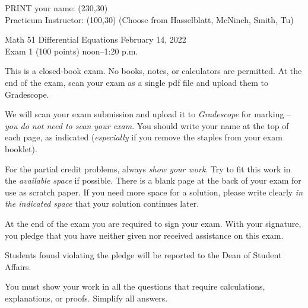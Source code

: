 \documentclass{article}
\begin{document}
\noindent
PRINT your name:  \framebox(230,30){}\\

\smallskip
\noindent
Practicum Instructor: \framebox(100,30){} (Choose from Hasselblatt, McNinch, Smith, Tu)


\begin{center}
Math 51 \hfill Differential Equations \hfill February 14, 2022\\
\hfill Exam 1 (100 points) \hfill noon--1:20 p.m.
\end{center}

\medskip

This is a closed-book exam.  No books, notes, or calculators are
permitted.  At the end of the exam, scan your exam as a single pdf
file and upload them to Gradescope.

We will scan your exam submission and upload it to \emph{Gradescope} for
marking -- \emph{you do not need to scan your exam}. You should write
your name at the top of each page, as indicated (\emph{especially} if you
remove the staples from your exam booklet).

For the partial credit problems, always \emph{show your work}. Try to
fit this work in the \emph{available space} if possible.  There is a
blank page at the back of your exam for use as scratch paper. If you
need more space for a solution, please write clearly \emph{in the
  indicated space} that your solution continues later.

At the end of the exam you are required to sign your exam. With your
signature, you pledge that you have neither given nor received
assistance on this exam.

Students found violating the pledge will be reported to
the Dean of Student Affairs.

You must show your work in all the questions that require
calculations, explanations, or proofs.  Simplify all answers.




\newpage
\end{document}
